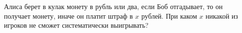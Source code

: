 Алиса берет в кулак монету в рубль или два, если Боб отгадывает, то он получает монету, иначе он платит штраф в $x$
рублей. При каком $x$ никакой из игроков не сможет систематически выигрывать?